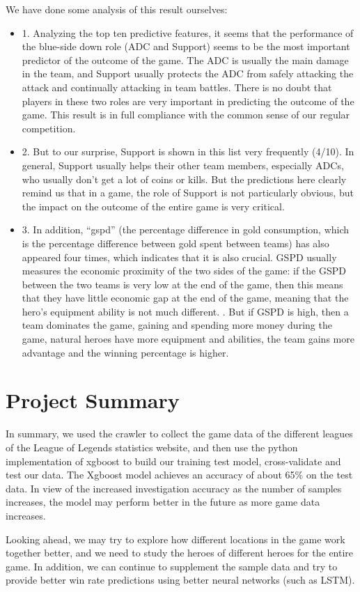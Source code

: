 \documentclass[fleqn,10pt]{wlscirep}
\begin{document}
We have done some analysis of this result ourselves:
\begin{itemize}
\item 1. Analyzing the top ten predictive features, it seems that the performance of the blue-side down role (ADC and Support) seems to be the most important predictor of the outcome of the game. The ADC is usually the main damage in the team, and Support usually protects the ADC from safely attacking the attack and continually attacking in team battles. There is no doubt that players in these two roles are very important in predicting the outcome of the game. This result is in full compliance with the common sense of our regular competition.
\item 2. But to our surprise, Support is shown in this list very frequently (4/10). In general, Support usually helps their other team members, especially ADCs, who usually don't get a lot of coins or kills. But the predictions here clearly remind us that in a game, the role of Support is not particularly obvious, but the impact on the outcome of the entire game is very critical.
\item 3. In addition, “gspd” (the percentage difference in gold consumption, which is the percentage difference between gold spent between teams) has also appeared four times, which indicates that it is also crucial. GSPD usually measures the economic proximity of the two sides of the game: if the GSPD between the two teams is very low at the end of the game, then this means that they have little economic gap at the end of the game, meaning that the hero's equipment ability is not much different. . But if GSPD is high, then a team dominates the game, gaining and spending more money during the game, natural heroes have more equipment and abilities, the team gains more advantage and the winning percentage is higher.\\
\end{itemize}

\section*{Project Summary}

In summary, we used the crawler to collect the game data of the different leagues of the League of Legends statistics website, and then use the python implementation of xgboost to build our training test model, cross-validate and test our data. The Xgboost model achieves an accuracy of about 65\% on the test data. In view of the increased investigation accuracy as the number of samples increases, the model may perform better in the future as more game data increases.

Looking ahead, we may try to explore how different locations in the game work together better, and we need to study the heroes of different heroes for the entire game. In addition, we can continue to supplement the sample data and try to provide better win rate predictions using better neural networks (such as LSTM).
\end{document}
